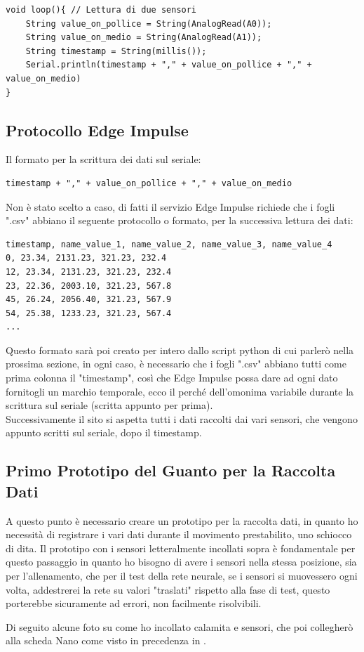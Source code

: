 \newpage{}

\begin{lstlisting}[language=Arduino]
void loop(){ // Lettura di due sensori
    String value_on_pollice = String(AnalogRead(A0));
    String value_on_medio = String(AnalogRead(A1));
    String timestamp = String(millis());
    Serial.println(timestamp + "," + value_on_pollice + "," + value_on_medio)
}
\end{lstlisting}






\subsection{Protocollo Edge Impulse} \label{sezione 2-1-1}
Il formato per la scrittura dei dati sul seriale:
\begin{lstlisting}[language=Arduino]
timestamp + "," + value_on_pollice + "," + value_on_medio
\end{lstlisting}
Non è stato scelto a caso, di fatti il servizio Edge Impulse richiede che i fogli ".csv" abbiano il seguente protocollo o formato, per la successiva lettura dei dati:
\begin{lstlisting}[language=HTML]
timestamp, name_value_1, name_value_2, name_value_3, name_value_4
0, 23.34, 2131.23, 321.23, 232.4
12, 23.34, 2131.23, 321.23, 232.4
23, 22.36, 2003.10, 321.23, 567.8
45, 26.24, 2056.40, 321.23, 567.9
54, 25.38, 1233.23, 321.23, 567.4
...
\end{lstlisting}
Questo formato sarà poi creato per intero dallo script python di cui parlerò nella prossima sezione, in ogni caso, è necessario che i fogli ".csv" abbiano tutti come prima colonna il "timestamp", così che Edge Impulse possa dare ad ogni dato fornitogli un marchio temporale, ecco il perché dell'omonima variabile durante la scrittura sul seriale (scritta appunto per prima).\\
Successivamente il sito si aspetta tutti i dati raccolti dai vari sensori, che vengono appunto scritti sul seriale, dopo il timestamp.

\subsection{Primo Prototipo del Guanto per la Raccolta Dati} \label{sezione 2-1-2}
A questo punto è necessario creare un prototipo per la raccolta dati, in quanto ho necessità di registrare i vari dati durante il movimento prestabilito, uno schiocco di dita.
Il prototipo con i sensori letteralmente incollati sopra è fondamentale per questo passaggio in quanto ho bisogno di avere i sensori nella stessa posizione, sia per l'allenamento, che per il test della rete neurale, se i sensori si muovessero ogni volta, addestrerei la rete su valori "traslati" rispetto alla fase di test, questo porterebbe sicuramente ad errori, non facilmente risolvibili.\par
Di seguito alcune foto su come ho incollato calamita e sensori, che poi collegherò alla scheda Nano come visto in precedenza in .

